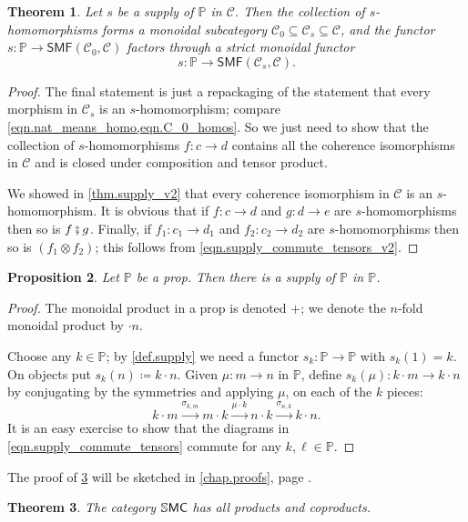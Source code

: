 \documentclass[11pt, oneside, article]{memoir}
\theoremstyle{plain}
\newtheorem{theorem}{Theorem}[chapter]
\newtheorem{proposition}[theorem]{Proposition}
\theoremstyle{definition}
\theoremstyle{remark}
\newcommand{\cat}[1]{\mathcal{#1}}%
\newcommand{\Cat}[1]{{\mathsf{#1}}}%
\newcommand{\CCat}[1]{\mathbb{\StrLeft{#1}{1}}\Cat{\StrGobbleLeft{#1}{1}}}%
\newcommand{\smf}{\Cat{SMF}}
\newcommand{\ssmc}{\CCat{SMC}}
\newcommand{\pp}{\mathbb{P}}
\newcommand{\mob}[1]{#1_0}
\newcommand{\cp}{\mathbin{\fatsemi}}
\newcommand{\To}[1]{\xrightarrow{#1}}
\renewcommand{\ss}{\subseteq}
\begin{document}
\begin{theorem}\label{thm.homos_form_subcat}
Let $s$ be a supply of $\pp$ in $\cat{C}$. Then the collection of $s$-homomorphisms forms a monoidal subcategory $\mob{\cat{C}}\ss\cat{C}_s\ss\cat{C}$, and the functor $s\colon\pp\to\smf(\mob{\cat{C}},\cat{C})$ factors through a strict monoidal functor
\[s\colon\pp\to\smf(\cat{C}_s,\cat{C}).\]
\end{theorem}
\begin{proof}
The final statement is just a repackaging of the statement that every morphism in $\cat{C}_s$ is an $s$-homomorphism; compare \cref{eqn.nat_means_homo,eqn.C_0_homos}. So we just need to show that the collection of $s$-homomorphisms $f\colon c\to d$ contains all the coherence isomorphisms in $\cat{C}$ and is closed under composition and tensor product. 

We showed in \cref{thm.supply_v2} that every coherence isomorphism in $\cat{C}$ is an $s$-homomorphism. It is obvious that if $f\colon c\to d$ and $g\colon d\to e$ are $s$-homomorphisms then so is $f\cp g$. Finally, if $f_1\colon c_1\to d_1$ and $f_2\colon c_2\to d_2$ are $s$-homomorphisms then so is $(f_1\otimes f_2)$; this follows from \cref{eqn.supply_commute_tensors_v2}.
\end{proof}


\begin{proposition}\label{prop.p_supplies_itself}
Let $\pp$ be a prop. Then there is a supply of $\pp$ in $\pp$.
\end{proposition}
\begin{proof}
The monoidal product in a prop is denoted $+$; we denote the $n$-fold monoidal product by $\cdot n$.

Choose any $k\in\pp$; by \cref{def.supply} we need a functor $s_k\colon\pp\to\pp$ with $s_k(1)=k$. On objects put $s_k(n)\coloneqq k\cdot n$. Given $\mu\colon m\to n$ in $\pp$, define $s_k(\mu)\colon k\cdot m\to k\cdot n$ by conjugating by the symmetries and applying $\mu$, on each of the $k$ pieces:
\begin{equation}\label{eqn.conjugation}
	k\cdot m\To{\sigma_{k,m}}
	m\cdot k\To{\mu\cdot k}
	n\cdot k\To{\sigma_{n,k}}
	k\cdot n.
\end{equation}
It is an easy exercise to show that the diagrams in \cref{eqn.supply_commute_tensors} commute for any $k,\ell\in\pp$.
\end{proof}

The proof of \cref{thm.smc_all_prod_coprod} will be sketched in \cref{chap.proofs}, page \pageref{page.smc_all_prod_coprod}.
\begin{theorem}\label{thm.smc_all_prod_coprod}
The category $\ssmc$ has all products and coproducts.
\end{theorem}
\end{document}
